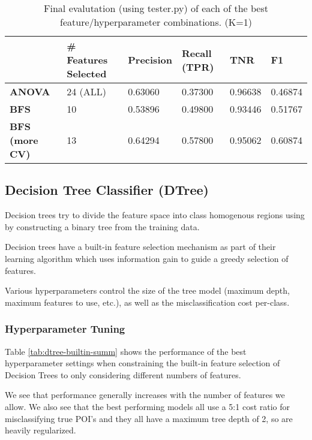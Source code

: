 \documentclass{article}
\begin{document}
\begin{table}[H]
\centering
\caption{Final evalutation (using tester.py) of each of the best feature/hyperparameter combinations. (K=1)}
\label{tab:knn-results}
\begin{tabular}{|l|l|l|l|l|l|}
\hline
                       & \textbf{\# Features Selected} & \textbf{Precision} & \textbf{Recall (TPR)} & \textbf{TNR} & \textbf{F1} \\ \hline
\textbf{ANOVA}         & 24 (ALL)                      & 0.63060            & 0.37300               & 0.96638      & 0.46874     \\ \hline
\textbf{BFS}           & 10                            & 0.53896            & 0.49800               & 0.93446      & 0.51767     \\ \hline
\textbf{BFS (more CV)} & 13                            & 0.64294            & 0.57800               & 0.95062      & 0.60874     \\ \hline
\end{tabular}
\end{table}
\subsection{Decision Tree Classifier (DTree)}

Decision trees try to divide the feature space into class homogenous regions using by constructing a binary tree from the training data. 

Decision trees have a built-in feature selection mechanism as part of their learning algorithm which uses information gain to guide a greedy selection of features.

Various hyperparameters control the size of the tree model (maximum depth, maximum features to use, etc.), as well as the misclassification cost per-class.

\subsubsection{Hyperparameter Tuning}

Table \ref{tab:dtree-builtin-summ} shows the performance of the best hyperparameter settings when constraining the built-in feature selection of Decision Trees to only considering different numbers of features.

We see that performance generally increases with the number of features we allow. We also see that the best performing models all use a 5:1 cost ratio for misclassifying true POI's and they all have a maximum tree depth of 2, so are heavily regularized.
\end{document}
